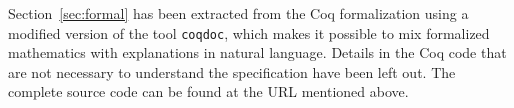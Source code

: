 \documentclass[10pt,a4paper]{article}
\begin{document}
Section~\ref{sec:formal} has been extracted from the Coq formalization using a modified version of the tool \texttt{coqdoc},
which makes it possible to mix formalized mathematics with explanations in natural language.
Details in the Coq code that are not necessary to understand the specification have been left out.
The complete source code can be found at the URL mentioned above.

\nonstopmode

\end{document}
